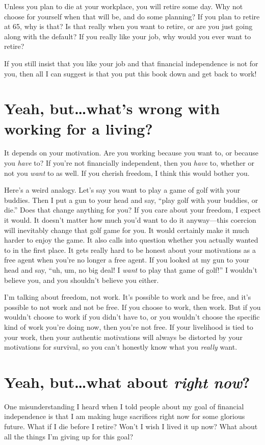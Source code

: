 Unless you plan to die at your workplace, you will retire some day. Why not choose for yourself when that will be, and do some planning? If you plan to retire at 65, why is that? Is that really when you want to retire, or are you just going along with the default? If you really like your job, why would you ever want to retire?

If you still insist that you like your job and that financial independence is not for you, then all I can suggest is that you put this book down and get back to work!

\section{Yeah, but\ldots what's wrong with working for a living?}
It depends on your motivation. Are you working because you want to, or because you \emph{have} to? If you're not financially independent, then you \emph{have} to, whether or not you \emph{want} to as well. If you cherish freedom, I think this would bother you.

Here's a weird analogy. Let's say you want to play a game of golf with your buddies. Then I put a gun to your head and say, ``play golf with your buddies, or die.'' Does that change anything for you? If you care about your freedom, I expect it would. It doesn't matter how much you'd want to do it anyway---this coercion will inevitably change that golf game for you. It would certainly make it much harder to enjoy the game. It also calls into question whether you actually wanted to in the first place. It gets really hard to be honest about your motivations as a free agent when you're no longer a free agent. If you looked at my gun to your head and say, ``uh, um, no big deal! I \emph{want} to play that game of golf!'' I wouldn't believe you, and you shouldn't believe you either.

I'm talking about freedom, not work. It's possible to work and be free, and it's possible to not work and not be free. If you choose to work, then work. But if you wouldn't choose to work if you didn't have to, or you wouldn't choose the specific kind of work you're doing now, then you're not free. If your livelihood is tied to your work, then your authentic motivations will always be distorted by your motivations for survival, so you can't honestly know what you \emph{really} want.

\section{Yeah, but\ldots what about \emph{right now}?}
One misunderstanding I heard when I told people about my goal of financial independence is that I am making huge sacrifices right now for some glorious future. What if I die before I retire? Won't I wish I lived it up now? What about all the things I'm giving up for this goal?

